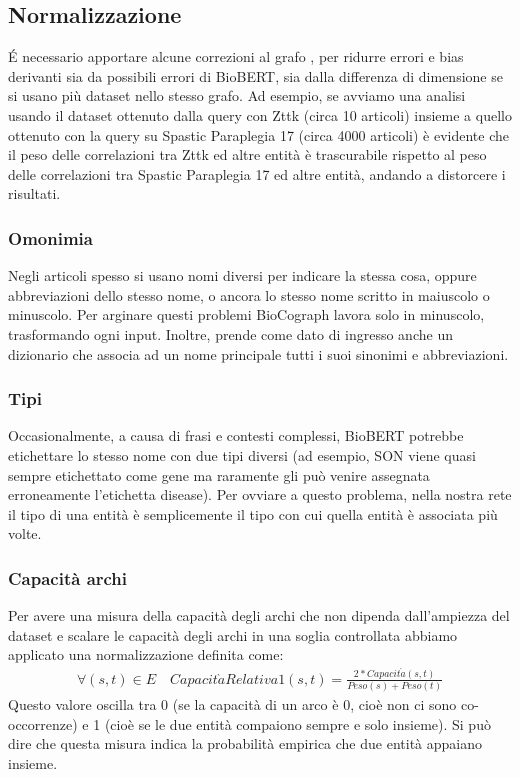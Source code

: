\documentclass[12pt]{report}
\begin{document}
\subsection{Normalizzazione}
\'E necessario apportare alcune correzioni al grafo , per ridurre errori e bias derivanti sia da possibili errori di BioBERT, sia dalla differenza di dimensione se si usano più dataset nello stesso grafo. Ad esempio, se avviamo una analisi usando il dataset ottenuto dalla query con Zttk (circa 10 articoli) insieme a quello ottenuto con la query su {Spastic Paraplegia 17} (circa 4000 articoli) è evidente che il peso delle correlazioni tra {Zttk} ed altre entità è trascurabile rispetto al peso delle correlazioni tra {Spastic Paraplegia 17} ed altre entità, andando a distorcere i risultati.

\subsubsection{Omonimia \label{normalizzazione_nomi}}
Negli articoli spesso si usano nomi diversi per indicare la stessa cosa, oppure abbreviazioni dello stesso nome, o ancora lo stesso nome scritto in maiuscolo o minuscolo. Per arginare questi problemi BioCograph lavora solo in minuscolo, trasformando ogni input. Inoltre, prende come dato di ingresso anche un dizionario che associa ad un nome principale tutti i suoi sinonimi e abbreviazioni. 

\subsubsection{Tipi \label{normalizzazione_tipi}}
Occasionalmente, a causa di frasi e contesti complessi, BioBERT potrebbe etichettare lo stesso nome con due tipi diversi (ad esempio, {SON} viene quasi sempre etichettato come gene ma raramente gli può venire assegnata erroneamente l'etichetta disease).
Per ovviare a questo problema, nella nostra rete il tipo di una entità è semplicemente il tipo con cui quella entità è associata più volte.

\subsubsection{Capacità archi \label{normalizzazione_archi}}
Per avere una misura della capacità degli archi che non dipenda dall'ampiezza del dataset e scalare le capacità degli archi in una soglia controllata abbiamo applicato una normalizzazione definita come:
\begin{gather}
    \forall (s, t) \in E \quad Capacit\grave{a}Relativa1(s, t) = \frac{2 * Capacit\grave{a}(s, t)}{Peso(s) + Peso(t)}
\end{gather}
Questo valore oscilla tra 0 (se la capacità di un arco è 0, cioè non ci sono co-occorrenze) e 1 (cioè se le due entità compaiono sempre e solo insieme). Si può dire che questa misura indica la probabilità empirica che due entità appaiano insieme.
\end{document}
